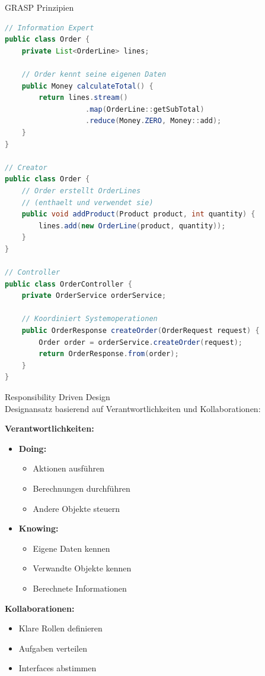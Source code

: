 \begin{concept}{GRASP Prinzipien}
\begin{lstlisting}[language=Java, style=basesmol]
// Information Expert
public class Order {
    private List<OrderLine> lines;
    
    // Order kennt seine eigenen Daten
    public Money calculateTotal() {
        return lines.stream()
                   .map(OrderLine::getSubTotal)
                   .reduce(Money.ZERO, Money::add);
    }
}

// Creator
public class Order {
    // Order erstellt OrderLines 
    // (enthaelt und verwendet sie)
    public void addProduct(Product product, int quantity) {
        lines.add(new OrderLine(product, quantity));
    }
}

// Controller
public class OrderController {
    private OrderService orderService;
    
    // Koordiniert Systemoperationen
    public OrderResponse createOrder(OrderRequest request) {
        Order order = orderService.createOrder(request);
        return OrderResponse.from(order);
    }
}
\end{lstlisting}
\end{concept}

\begin{concept}{Responsibility Driven Design}\\
Designansatz basierend auf Verantwortlichkeiten und Kollaborationen:

\textbf{Verantwortlichkeiten:}
\begin{itemize}
    \item \textbf{Doing:}
    \begin{itemize}
        \item Aktionen ausführen
        \item Berechnungen durchführen
        \item Andere Objekte steuern
    \end{itemize}
    
    \item \textbf{Knowing:}
    \begin{itemize}
        \item Eigene Daten kennen
        \item Verwandte Objekte kennen
        \item Berechnete Informationen
    \end{itemize}
\end{itemize}

\textbf{Kollaborationen:}
\begin{itemize}
    \item Klare Rollen definieren
    \item Aufgaben verteilen
    \item Interfaces abstimmen
\end{itemize}
\end{concept}

